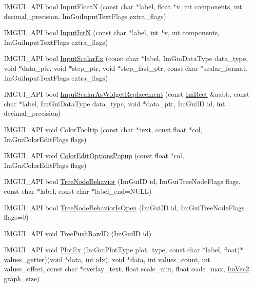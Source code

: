\begin{DoxyCompactItemize}
I\+M\+G\+U\+I\+\_\+\+A\+PI bool \hyperlink{namespace_im_gui_a7fe2c74d1c0042b77d8e6788faed0983}{Input\+FloatN} (const char $\ast$label, float $\ast$v, int components, int decimal\+\_\+precision, Im\+Gui\+Input\+Text\+Flags extra\+\_\+flags)
\item 
I\+M\+G\+U\+I\+\_\+\+A\+PI bool \hyperlink{namespace_im_gui_a9b9aaec8d095156b74ee191b532fa137}{Input\+IntN} (const char $\ast$label, int $\ast$v, int components, Im\+Gui\+Input\+Text\+Flags extra\+\_\+flags)
\item 
I\+M\+G\+U\+I\+\_\+\+A\+PI bool \hyperlink{namespace_im_gui_a08c243542b1678859cf0e065f9e43865}{Input\+Scalar\+Ex} (const char $\ast$label, Im\+Gui\+Data\+Type data\+\_\+type, void $\ast$data\+\_\+ptr, void $\ast$step\+\_\+ptr, void $\ast$step\+\_\+fast\+\_\+ptr, const char $\ast$scalar\+\_\+format, Im\+Gui\+Input\+Text\+Flags extra\+\_\+flags)
\item 
I\+M\+G\+U\+I\+\_\+\+A\+PI bool \hyperlink{namespace_im_gui_a9b7223f54687d740a5961d7f278e01ef}{Input\+Scalar\+As\+Widget\+Replacement} (const \hyperlink{struct_im_rect}{Im\+Rect} \&aabb, const char $\ast$label, Im\+Gui\+Data\+Type data\+\_\+type, void $\ast$data\+\_\+ptr, Im\+Gui\+ID id, int decimal\+\_\+precision)
\item 
I\+M\+G\+U\+I\+\_\+\+A\+PI void \hyperlink{namespace_im_gui_afad90b366b6471e3b13175c0ebeb26c8}{Color\+Tooltip} (const char $\ast$text, const float $\ast$col, Im\+Gui\+Color\+Edit\+Flags flags)
\item 
I\+M\+G\+U\+I\+\_\+\+A\+PI void \hyperlink{namespace_im_gui_a6bfb117816d669f8704e5d0c0c0795fe}{Color\+Edit\+Options\+Popup} (const float $\ast$col, Im\+Gui\+Color\+Edit\+Flags flags)
\item 
I\+M\+G\+U\+I\+\_\+\+A\+PI bool \hyperlink{namespace_im_gui_a918eabf70d288e93b2519ee1eac2c0b4}{Tree\+Node\+Behavior} (Im\+Gui\+ID id, Im\+Gui\+Tree\+Node\+Flags flags, const char $\ast$label, const char $\ast$label\+\_\+end=N\+U\+LL)
\item 
I\+M\+G\+U\+I\+\_\+\+A\+PI bool \hyperlink{namespace_im_gui_a22cc50485aad6da8a3a4e156b500ed4a}{Tree\+Node\+Behavior\+Is\+Open} (Im\+Gui\+ID id, Im\+Gui\+Tree\+Node\+Flags flags=0)
\item 
I\+M\+G\+U\+I\+\_\+\+A\+PI void \hyperlink{namespace_im_gui_afddcddce9f2801769e4c79ef769ab600}{Tree\+Push\+Raw\+ID} (Im\+Gui\+ID id)
\item 
I\+M\+G\+U\+I\+\_\+\+A\+PI void \hyperlink{namespace_im_gui_a0a18ae07b294d5667f95a5c003d2efb6}{Plot\+Ex} (Im\+Gui\+Plot\+Type plot\+\_\+type, const char $\ast$label, float($\ast$values\+\_\+getter)(void $\ast$data, int idx), void $\ast$data, int values\+\_\+count, int values\+\_\+offset, const char $\ast$overlay\+\_\+text, float scale\+\_\+min, float scale\+\_\+max, \hyperlink{struct_im_vec2}{Im\+Vec2} graph\+\_\+size)

\end{DoxyCompactItemize}
